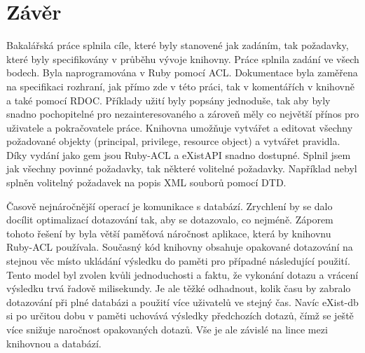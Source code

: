 \chapter{Závěr}

Bakalářská práce splnila cíle, které byly stanovené jak zadáním, tak požadavky, které byly specifikovány v průběhu vývoje knihovny. Práce splnila zadání ve všech bodech. Byla naprogramována v Ruby pomocí ACL. Dokumentace byla zaměřena na specifikaci rozhraní, jak přímo zde v této práci, tak v komentářích v knihovně a také pomocí RDOC. Příklady užití byly popsány jednoduše, tak aby byly snadno pochopitelné pro nezainteresovaného a zároveň měly co největší přínos pro uživatele a pokračovatele práce. Knihovna umožňuje vytvářet a editovat všechny požadované objekty (principal, privilege, resource object) a vytvářet pravidla. Díky vydání jako gem jsou Ruby-ACL a eXistAPI snadno dostupné. Splnil jsem jak všechny povinné požadavky, tak některé volitelné požadavky.  Například nebyl splněn volitelný požadavek na popis XML souborů pomocí DTD.

Časově nejnáročnější operací je komunikace s databází. Zrychlení by se dalo docílit optimalizací dotazování tak, aby se dotazovalo, co nejméně. Záporem tohoto řešení by byla větší paměťová náročnost aplikace, která by knihovnu Ruby-ACL používala. Současný kód knihovny obsahuje opakované dotazování na stejnou věc místo ukládání výsledku do paměti pro případné následující použití. Tento model byl zvolen kvůli jednoduchosti a faktu, že vykonání dotazu a vrácení výsledku trvá řadově milisekundy. Je ale těžké odhadnout, kolik času by zabralo dotazování při plné databázi a použití více uživatelů ve stejný čas. Navíc eXist-db si po určitou dobu v paměti uchovává výsledky předchozích dotazů, čímž se ještě více snižuje naročnost opakovaných dotazů. Vše je ale závislé na lince mezi knihovnou a databází.